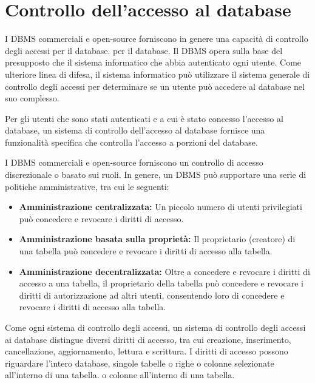 \section{Controllo dell'accesso al database}
I DBMS commerciali e open-source forniscono in genere una capacità di controllo degli accessi per il database.
per il database. Il DBMS opera sulla base del presupposto che il sistema informatico che abbia autenticato ogni utente. Come ulteriore linea di difesa, il sistema informatico può utilizzare il sistema generale di controllo degli accessi per determinare se un utente può accedere al database nel suo complesso.

\singlespacing

Per gli utenti che sono stati autenticati e a cui è stato concesso l'accesso al database, un sistema di controllo dell'accesso al database fornisce una funzionalità specifica che controlla l'accesso a porzioni del database.

\singlespacing

I DBMS commerciali e open-source forniscono un controllo di accesso discrezionale o basato sui ruoli. In genere, un DBMS può supportare una serie di politiche amministrative, tra cui le seguenti:

\begin{itemize}
    \item \textbf{Amministrazione centralizzata:} Un piccolo numero di utenti privilegiati può concedere e revocare i diritti di accesso.

    \item \textbf{Amministrazione basata sulla proprietà:} Il proprietario (creatore) di una tabella può concedere e revocare i diritti di accesso alla tabella.
    
    \item \textbf{Amministrazione decentralizzata:} Oltre a concedere e revocare i diritti di accesso a una tabella, il proprietario della tabella può concedere e revocare i diritti di autorizzazione ad altri utenti, consentendo loro di concedere e revocare i diritti di accesso alla tabella.
\end{itemize}

Come ogni sistema di controllo degli accessi, un sistema di controllo degli accessi ai database distingue diversi diritti di accesso, tra cui creazione, inserimento, cancellazione, aggiornamento, lettura e scrittura. I diritti di accesso possono riguardare l'intero database, singole tabelle o righe o colonne selezionate all'interno di una tabella.
o colonne all'interno di una tabella. 

